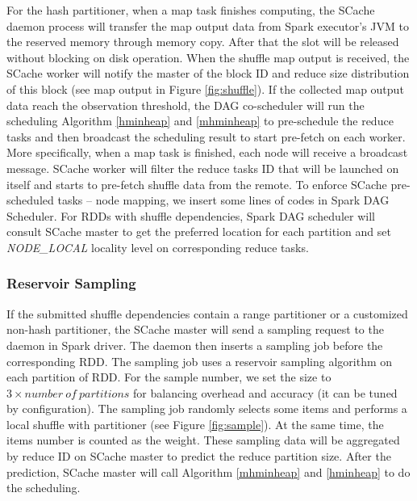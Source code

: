 For the hash partitioner, when a map task finishes computing, the SCache daemon process will transfer the map output data from Spark executor's JVM to the reserved memory through memory copy.
After that the slot will be released without blocking on disk operation.
When the shuffle map output is received, the SCache worker will notify the master of the block ID and reduce size distribution of this block (see map output in Figure \ref{fig:shuffle}).
If the collected map output data reach the observation threshold, the DAG co-scheduler will run the scheduling Algorithm \ref{hminheap} and \ref{mhminheap} to pre-schedule the reduce tasks and then broadcast the scheduling result to start pre-fetch on each worker.
More specifically, when a map task is finished, each node will receive a broadcast message. SCache worker will filter the reduce tasks ID that will be launched on itself and starts to pre-fetch shuffle data from the remote. 
To enforce SCache pre-scheduled tasks -- node mapping, we insert some lines of codes in Spark DAG Scheduler.
For RDDs with shuffle dependencies, Spark DAG scheduler will consult SCache master to get the preferred location for each partition and set \textit{NODE\_LOCAL} locality level on corresponding reduce tasks.

\subsubsection{Reservoir Sampling}\label{sampling}
If the submitted shuffle dependencies contain a range partitioner or a customized non-hash partitioner, the SCache master will send a sampling request to the daemon in Spark driver. The daemon then inserts a sampling job before the corresponding RDD. The sampling job uses a reservoir sampling algorithm \cite{reservoir} on each partition of RDD. For the sample number, we set the size to $3 \times number\ of\ partitions$ for balancing overhead and accuracy (it can be tuned by configuration). The sampling job randomly selects some items and performs a local shuffle with partitioner (see Figure \ref{fig:sample}). At the same time, the items number is counted as the weight. These sampling data will be aggregated by reduce ID on SCache master to predict the reduce partition size. After the prediction, SCache master will call Algorithm \ref{mhminheap} and \ref{hminheap} to do the scheduling.

